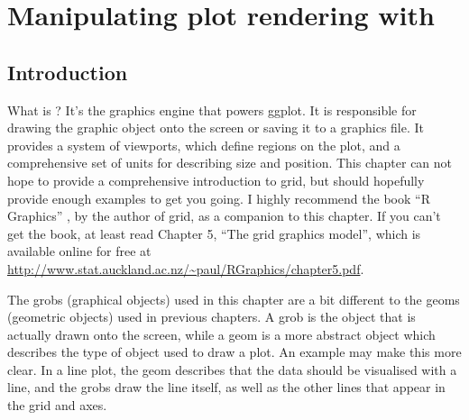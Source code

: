 

% 



\chapter{Manipulating plot rendering with }
\label{cha:grid}

\section{Introduction}



What is ?  It's the graphics engine that powers ggplot.  It is responsible for drawing the graphic object onto the screen or saving it to a graphics file.  It provides a system of viewports, which define regions on the plot, and a comprehensive set of units for describing size and position. This chapter can not hope to provide a comprehensive introduction to grid, but should hopefully provide enough examples to get you going.   I highly recommend the book ``R Graphics'' \citep{murrell:2005}, by the author of grid,  as a companion to this chapter.  If you can't get the book, at least read Chapter 5, ``The grid graphics model'', which is available online for free at  \url{http://www.stat.auckland.ac.nz/~paul/RGraphics/chapter5.pdf}.

The grobs (graphical objects) used in this chapter are a bit different to the geoms (geometric objects) used in previous chapters.  A grob is the object that is actually drawn onto the screen, while a geom is a more abstract object which describes the type of object used to draw a plot.  An example may make this more clear. In a line plot, the geom describes that the data should be visualised with a line, and the grobs draw the line itself, as well as the other lines that appear in the grid and axes.

